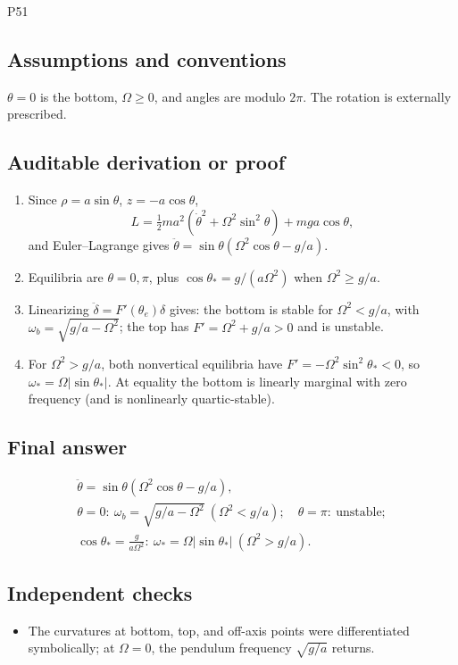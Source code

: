 \documentclass[11pt]{article}
\begin{document}
\begin{mprsolution}{P51}
\subsection*{Assumptions and conventions}
\(\theta=0\) is the bottom, \(\Omega\ge0\), and angles are modulo \(2\pi\).
The rotation is externally prescribed.
\subsection*{Auditable derivation or proof}
\begin{enumerate}[label=\textbf{Step \arabic*:},leftmargin=*]
\item Since \(\rho=a\sin\theta\), \(z=-a\cos\theta\),
\[
L=\tfrac12ma^2(\dot\theta^2+\Omega^2\sin^2\theta)+mga\cos\theta,
\]
and Euler--Lagrange gives
\(\ddot\theta=\sin\theta(\Omega^2\cos\theta-g/a)\).
\item Equilibria are \(\theta=0,\pi\), plus
\(\cos\theta_*=g/(a\Omega^2)\) when \(\Omega^2\ge g/a\).
\item Linearizing \(\ddot\delta=F'(\theta_e)\delta\) gives:
the bottom is stable for \(\Omega^2<g/a\), with
\(\omega_b=\sqrt{g/a-\Omega^2}\); the top has
\(F'=\Omega^2+g/a>0\) and is unstable.
\item For \(\Omega^2>g/a\), both nonvertical equilibria have
\(F'=-\Omega^2\sin^2\theta_*<0\), so
\(\omega_*=\Omega|\sin\theta_*|\).  At equality the bottom is linearly
marginal with zero frequency (and is nonlinearly quartic-stable).
\end{enumerate}
\subsection*{Final answer}
\[
\boxed{\begin{gathered}
\ddot\theta=\sin\theta(\Omega^2\cos\theta-g/a),\\
\theta=0:\ \omega_b=\sqrt{g/a-\Omega^2}\ (\Omega^2<g/a);
\quad\theta=\pi:\ \text{unstable};\\
\cos\theta_*=\frac{g}{a\Omega^2}:\ 
\omega_*=\Omega|\sin\theta_*|\ (\Omega^2>g/a).
\end{gathered}}
\]
\subsection*{Independent checks}
\begin{itemize}[leftmargin=*]
\item The curvatures at bottom, top, and off-axis points were differentiated
symbolically; at \(\Omega=0\), the pendulum frequency \(\sqrt{g/a}\) returns.
\end{itemize}

\end{mprsolution}
\end{document}

